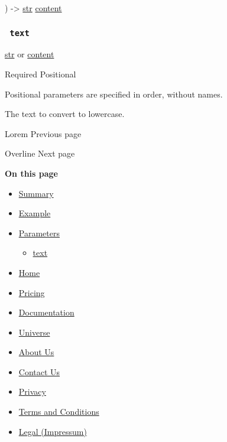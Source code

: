 ) -\textgreater{} \href{/docs/reference/foundations/str/}{str}
\href{/docs/reference/foundations/content/}{content}

\subsubsection{\texorpdfstring{\texttt{\ text\ }}{ text }}\label{parameters-text}

\href{/docs/reference/foundations/str/}{str} {or}
\href{/docs/reference/foundations/content/}{content}

{Required} {{ Positional }}

\label{parameters-text-positional-tooltip}
Positional parameters are specified in order, without names.

The text to convert to lowercase.

\href{/docs/reference/text/lorem/}{\pandocbounded{}}

{ Lorem } { Previous page }

\href{/docs/reference/text/overline/}{\pandocbounded{}}

{ Overline } { Next page }

\textbf{On this page}

\begin{itemize}
\tightlist
\item
  \hyperref[summary]{Summary}
\item
  \hyperref[example]{Example}
\item
  \hyperref[parameters]{Parameters}

  \begin{itemize}
  \tightlist
  \item
    \hyperref[parameters-text]{text}
  \end{itemize}
\end{itemize}

\begin{itemize}
\tightlist
\item
  \href{/}{Home}
\item
  \href{/pricing/}{Pricing}
\item
  \href{/docs/}{Documentation}
\item
  \href{/universe/}{Universe}
\item
  \href{/about/}{About Us}
\item
  \href{/contact/}{Contact Us}
\item
  \href{/privacy/}{Privacy}
\item
  \href{https://typst.app/terms}{Terms and Conditions}
\item
  \href{/legal/}{Legal (Impressum)}
\end{itemize}


